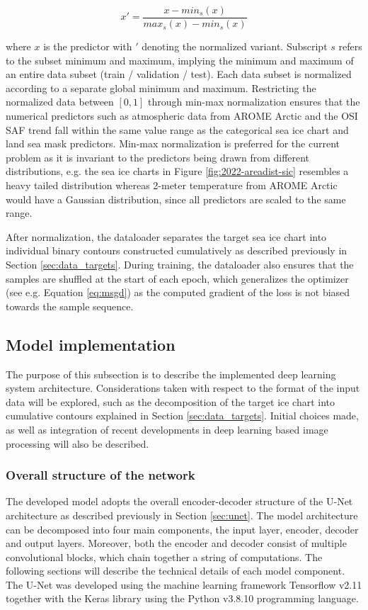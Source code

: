\documentclass[../main/thesis]{subfiles}
\begin{document}
\begin{equation}
    x' = \frac{x - min_s(x)}{max_s(x) - min_s(x)}
\end{equation}

where $x$ is the predictor with $'$ denoting the normalized variant. Subscript $s$ refers to the subset minimum and maximum, implying the minimum and maximum of an entire data subset (train / validation / test). Each data subset is normalized according to a separate global minimum and maximum. Restricting the normalized data between $\left[0, 1\right]$ through min-max normalization ensures that the numerical predictors such as atmospheric data from AROME Arctic and the OSI SAF trend fall within the same value range as the categorical sea ice chart and land sea mask predictors. Min-max normalization is preferred for the current problem as it is invariant to the predictors being drawn from different distributions, e.g. the sea ice charts in Figure \ref{fig:2022-areadist-sic} resembles a heavy tailed distribution whereas 2-meter temperature from AROME Arctic would have a Gaussian distribution, since all predictors are scaled to the same range.

After normalization, the dataloader separates the target sea ice chart into individual binary contours constructed cumulatively as described previously in Section \ref{sec:data_targets}. During training, the dataloader also ensures that the samples are shuffled at the start of each epoch, which generalizes the optimizer (see e.g. Equation \ref{eq:msgd}) as the computed gradient of the loss is not biased towards the sample sequence.

\subsection{Model implementation}
\label{sec:implementation}
The purpose of this subsection is to describe the implemented deep learning system architecture. Considerations taken with respect to the format of the input data will be explored, such as the decomposition of the target ice chart into cumulative contours explained in Section \ref{sec:data_targets}. Initial choices made, as well as integration of recent developments in deep learning based image processing will also be described.

\subsubsection{Overall structure of the network}
The developed model adopts the overall encoder-decoder structure of the U-Net architecture as described previously in Section \ref{sec:unet}. The model architecture can be decomposed into four main components, the input layer, encoder, decoder and output layers. Moreover, both the encoder and decoder consist of multiple convolutional blocks, which chain together a string of computations. The following sections will describe the technical details of each model component. The U-Net was developed using the machine learning framework Tensorflow v2.11 \citep{tensorflow2015-whitepaper} together with the Keras library \citep{chollet2015keras} using the Python v3.8.10 programming language. 
\end{document}
